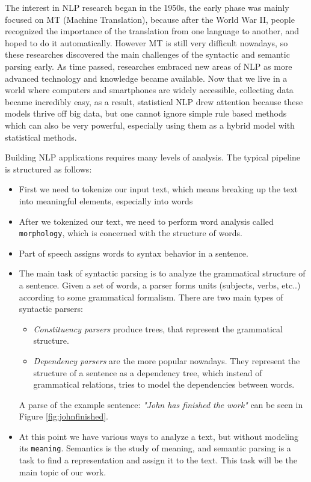 The interest in NLP research began in the 1950s, the early phase was mainly focused on MT (Machine Translation), because after the World War II, people
recognized the importance of the translation from one language to another, and hoped to do it automatically.
However MT is still very difficult nowadays, so these researches discovered the main challenges of the syntactic and semantic parsing early.
As time passed, researches embraced new areas of NLP as more advanced technology and knowledge became available. Now that we live in a world where
computers and smartphones are widely accessible, collecting data became incredibly easy, as a result, statistical NLP drew attention because these models thrive off big data, but one cannot ignore 
simple rule based methods which can also be very powerful, especially using them as a hybrid model with statistical methods.

Building NLP applications requires many levels of analysis.
The typical pipeline is structured as follows:
\begin{itemize}
	\item First we need to tokenize our input text, which means breaking up the text into meaningful elements, especially into words
	\item After we tokenized our text, we need to perform word analysis called \texttt{morphology}, which is concerned with the structure of words.
	\item Part of speech assigns words to syntax behavior in a sentence.
	\item The main task of syntactic parsing is to analyze the grammatical structure of a sentence. Given a set of words, a parser forms units (subjects, verbs, etc..) according to some grammatical formalism.
	There are two main types of syntactic parsers:
	\begin{itemize}
		\item \textit{Constituency parsers} produce trees, that represent the grammatical structure.
		\item \textit{Dependency parsers} are the more popular nowadays. They represent the structure of a sentence as a dependency tree, which instead of grammatical relations, tries to model the dependencies between words.
	\end{itemize}
	A parse of the example sentence: \textit{"John has finished the work"} can be seen in Figure \ref{fig:johnfinished}.
	
	\item At this point we have various ways to analyze a text, but without modeling its \texttt{meaning}. Semantics is the study of meaning, and semantic parsing is a task to find a representation and assign it to the text. This task will be the main topic of our work.
\end{itemize}

